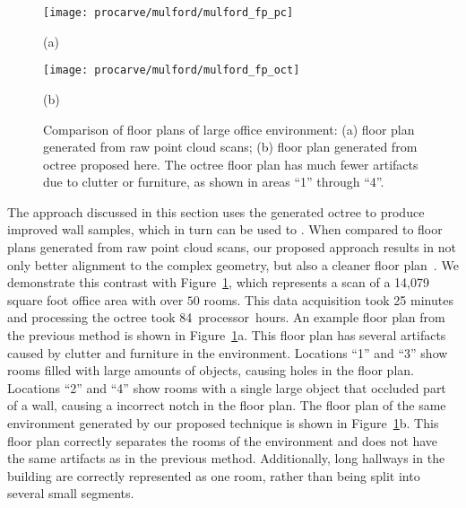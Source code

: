 \documentclass[12pt,onecolumn,oneside]{book}
\begin{document}
\begin{figure}[t]

	\centering
	\begin{minipage}[t]{1.0\linewidth}
		\centerline{\texttt{[image: procarve/mulford/mulford\_fp\_pc]}}
		\centerline{(a)}
	\end{minipage}

	\begin{minipage}[t]{1.0\linewidth}
		\centerline{\texttt{[image: procarve/mulford/mulford\_fp\_oct]}}
		\centerline{(b)}
	\end{minipage}

	\caption[Comparison of floor plans of large office environment.]{Comparison of floor plans of large office environment: (a) floor plan generated from raw point cloud scans; (b) floor plan generated from octree proposed here.  The octree floor plan has much fewer artifacts due to clutter or furniture, as shown in areas ``1'' through ``4''.}
	\label{fig:compare_fp_mulford}

\end{figure}

The approach discussed in this section uses the generated octree to produce improved wall samples, which in turn can be used to .  When compared to floor plans generated from raw point cloud scans, our proposed approach results in not only better alignment to the complex geometry, but also a cleaner floor plan~\cite{Turner14}.  We demonstrate this contrast with Figure~\ref{fig:compare_fp_mulford}, which represents a scan of a 14,079 square foot office area with over $50$ rooms.  This data acquisition took 25 minutes and processing the octree took 84~processor~hours.  An example floor plan from the previous method is shown in Figure~\ref{fig:compare_fp_mulford}a.  This floor plan has several artifacts caused by clutter and furniture in the environment.  Locations ``1'' and ``3'' show rooms filled with large amounts of objects, causing holes in the floor plan.  Locations ``2'' and ``4'' show rooms with a single large object that occluded part of a wall, causing a incorrect notch in the floor plan.  The floor plan of the same environment generated by our proposed technique is shown in Figure~\ref{fig:compare_fp_mulford}b.  This floor plan correctly separates the rooms of the environment and does not have the same artifacts as in the previous method.  Additionally, long hallways in the building are correctly represented as one room, rather than being split into several small segments.
\end{document}
